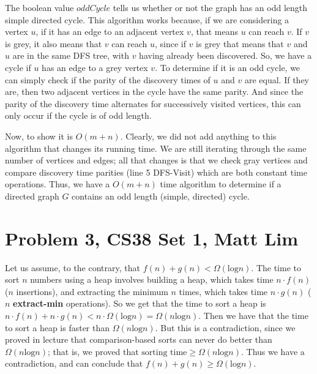 \documentclass{article}
\begin{document}
\begin{description}
        The boolean value $oddCycle$ tells us whether or not the graph
        has an odd length simple directed cycle.
        This algorithm works because, if we are considering a vertex $u$, if
        it has an edge to an adjacent vertex $v$, that means $u$ can reach $v$.
        If $v$ is grey, it also means that $v$ can reach $u$, since if $v$ is
        grey that means that $v$ and $u$ are in the same DFS tree, with $v$
        having already been discovered. So, we have a
        cycle if $u$ has an edge to a grey vertex $v$. To determine if
        it is an odd cycle, we can simply check if the parity of the discovery
        times of $u$ and $v$ are equal. If they are, then two adjacent vertices
        in the cycle have the same parity. And since the parity of the discovery
        time alternates for successively visited vertices, this can only
        occur if the cycle is of odd length.

        Now, to show it is $O(m+n)$. Clearly, we did not add anything to this
        algorithm that changes its
        running time. We are still iterating through the same number of vertices
        and edges; all that changes is that we check gray vertices and compare
        discovery time parities (line 5 DFS-Visit) which are both constant time
        operations. Thus, we have a $O(m+n)$ time algorithm to determine if a
        directed graph $G$ contains an odd length (simple, directed) cycle.
\end{description}
\newpage

\section*{Problem 3, CS38 Set 1, Matt Lim}
Let us assume, to the contrary, that $f(n) + g(n) < \Omega(\text{log}n)$.
The time to sort $n$ numbers using a heap involves building a heap, which takes
time $n \cdot f(n)$ ($n$ insertions), and extracting the minimum $n$ times,
which takes time $n \cdot g(n)$ ($n$
\textbf{extract-min} operations). So we get that the time to sort a heap is
$n \cdot f(n) + n \cdot g(n) < n \cdot \Omega(\text{log}n) =
\Omega(n\text{log}n)$. Then we have that the time to sort a heap is faster than
$\Omega(n\text{log}n)$. But this is a contradiction, since we proved in lecture that
comparison-based sorts can never do better than $\Omega(n\text{log}n)$; that is,
we proved that $\text{sorting time} \ge \Omega(n\text{log}n)$. Thus we have
a contradiction, and can
conclude that $f(n) + g(n) \ge \Omega(\text{log}n)$.
\newpage
\end{document}
